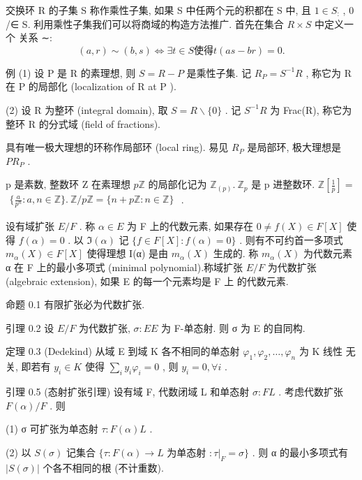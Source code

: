 \documentclass[]{article}
\begin{document}
交换环 R 的子集 S 称作乘性子集, 如果 S 中任两个元的积都在 S 中, 且 $1 \in S _ { \mathrm { : } }$ , 0 /∈ S. 利用乘性子集我们可以将商域的构造方法推广. 首先在集合 $R \times S$ 中定义一个 关系 ∼:$$
(a, r) \sim (b, s) \Leftrightarrow \exists t \in S \text {使得} t (a s - b r) = 0.
$$

例 (1) 设 P 是 R 的素理想, 则 $S = R - P$ 是乘性子集. 记 $R _ { P } = S ^ { - 1 } R$ , 称它为 R 在 P 的局部化 (localization of R at P ). 

(2) 设 R 为整环 (integral domain), 取 $S = R \backslash \{ 0 \}$ . 记 $S ^ { - 1 } R$ 为 Frac(R), 称它为 整环 R 的分式域 (field of fractions). 

具有唯一极大理想的环称作局部环 (local ring). 易见 $R _ { P }$ 是局部环, 极大理想是 $P R _ { P }$ . 

p 是素数, 整数环 Z 在素理想 $p \mathbb { Z }$ 的局部化记为 $\mathbb { Z } _ { ( p ) } . \ \mathbb { Z } _ { p }$ 是 p 进整数环. $\mathbb { Z } [ \textstyle { \frac { 1 } { p } } ] =$ $\begin{array} { r } { \{ \frac { a } { p ^ { n } } : a , n \in \mathbb { Z } \} . \ \mathbb { Z } / p \mathbb { Z } = \{ n + p \mathbb { Z } : n \in \mathbb { Z } \} } \end{array}$ . 

设有域扩张 $E / F$ . 称 $\alpha \in E$ 为 F 上的代数元素, 如果存在 $0 \not = f ( X ) \in F [ X ]$ 使得 $f ( \alpha ) = 0$ . 以 $\Im ( \alpha )$ 记 $\{ f \in F [ X ] : f ( \alpha ) = 0 \}$ . 则有不可约首一多项式 $m _ { \alpha } ( X ) \in F [ X ]$ 使得理想 I(α) 是由 $m _ { \alpha } ( X )$ 生成的. 称 $m _ { \alpha } ( X )$ 为代数元素 α 在 F 上的最小多项式 (minimal polynomial).称域扩张 $E / F$ 为代数扩张 (algebraic extension), 如果 E 的每一个元素均是 F 上 的代数元素. 

命题 0.1 有限扩张必为代数扩张. 

引理 0.2 设 $E / F$ 为代数扩张, $\sigma : E  E$ 为 F-单态射. 则 σ 为 E 的自同构. 

定理 0.3 (Dedekind) 从域 E 到域 K 各不相同的单态射 $\varphi _ { 1 } , \varphi _ { 2 } , \ldots , \varphi _ { n }$ 为 K 线性 无关, 即若有 $y _ { i } \in K$ 使得 $\textstyle \sum _ { i } y _ { i } \varphi _ { i } = 0$ , 则 $y _ { i } = 0 , \forall i$ . 

引理 0.5 (态射扩张引理) 设有域 F, 代数闭域 L 和单态射 $\sigma : F  L$ . 考虑代数扩张 $F ( \alpha ) / F$ . 则   

(1) σ 可扩张为单态射 $\tau : F ( \alpha )  L$ . 

(2) 以 $S ( \sigma )$ 记集合 $\{ \tau : F ( \alpha ) \to L$ 为单态射 $: \tau | _ { F } = \sigma \}$ . 则 α 的最小多项式有 $| S ( \sigma ) |$ 个各不相同的根 (不计重数). 
\end{document}
